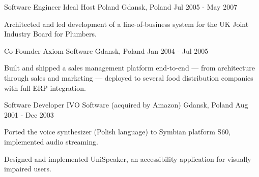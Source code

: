 \begin{cventries}
\cventry
{Software Engineer} %
{Ideal Host Poland} %
{Gdansk, Poland} %
{Jul 2005 - May 2007} %
{
  \begin{cvitems} %
    \item
    {
      Architected and led development of a line-of-business system for the UK Joint Industry Board for Plumbers.
    }
  \end{cvitems}
}
\par\vspace{2mm}

\cventry
{Co-Founder} %
{Axiom Software} %
{Gdansk, Poland} %
{Jan 2004 - Jul 2005} %
{
  \begin{cvitems} %
    \item
    {
      Built and shipped a sales management platform end-to-end --- from architecture through sales and marketing --- deployed to several food distribution companies with full ERP integration.
    }
  \end{cvitems}
}
\par\vspace{2mm}

\cventry
{Software Developer} %
{IVO Software (acquired by Amazon)} %
{Gdansk, Poland} %
{Aug 2001 - Dec 2003} %
{
  \begin{cvitems} %
    \item
    {
      Ported the voice synthesizer (Polish language) to Symbian platform S60, implemented audio streaming.
    }
    \item
    {
      Designed and implemented UniSpeaker, an accessibility application for visually impaired users.
    }
  \end{cvitems}
}

\end{cventries}
